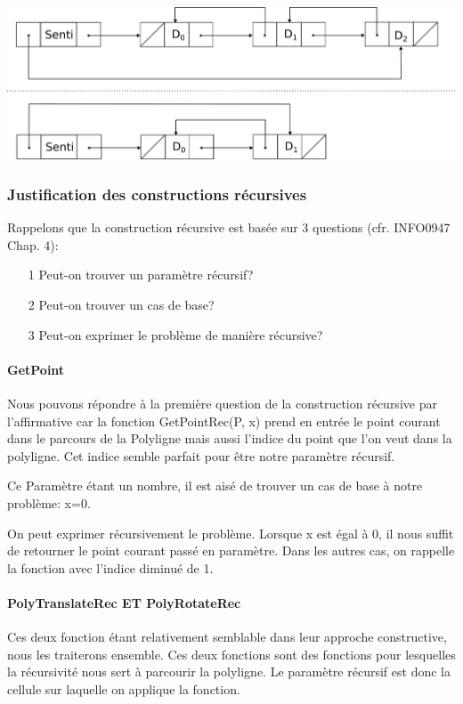 \documentclass[a4paper, 11pt, oneside]{article}
\begin{document}
\includegraphics[scale=0.7]{supp.png}

\subsubsection{Justification des constructions récursives}

Rappelons que la construction récursive est basée sur 3 questions (cfr. INFO0947 Chap. 4):
\begin{itemize}
    \item[1] Peut-on trouver un paramètre récursif?
    \item[2] Peut-on trouver un cas de base?
    \item[3] Peut-on exprimer le problème de manière récursive?
\end{itemize}




\paragraph{GetPoint}

Nous pouvons répondre à la première question de la construction récursive par l'affirmative car la fonction GetPointRec(P, x) prend en entrée le point courant dans le parcours de la Polyligne mais aussi l'indice du point que l'on veut dans la polyligne. Cet indice semble parfait pour être notre paramètre récursif.

Ce Paramètre étant un nombre, il est aisé de trouver un cas de base à notre problème: x=0.

On peut exprimer récursivement le problème. Lorsque x est égal à 0, il nous suffit de retourner le point courant passé en paramètre. Dans les autres cas, on rappelle la fonction avec l'indice diminué de 1.


\paragraph{PolyTranslateRec ET PolyRotateRec}
Ces deux fonction étant relativement semblable dans leur approche constructive, nous les traiterons ensemble. Ces deux fonctions sont des fonctions pour lesquelles la récursivité nous sert à parcourir la polyligne. Le paramètre récursif est donc la cellule sur laquelle on applique la fonction. 
\end{document}
